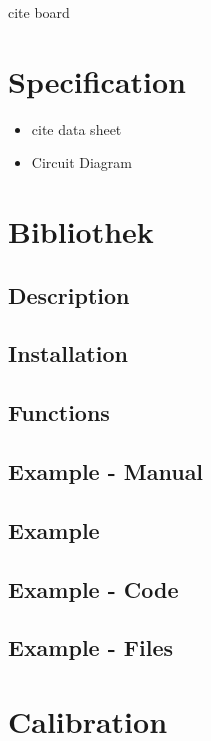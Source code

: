 cite board

\section{Specification}

\begin{itemize}
  \item cite data sheet
  \item Circuit Diagram
\end{itemize}

\section{Bibliothek}

\subsection{Description}

\subsection{Installation}

\subsection{Functions}

\subsection{Example - Manual}

\subsection{Example}

\subsection{Example - Code}

\subsection{Example - Files}



\section{Calibration}

